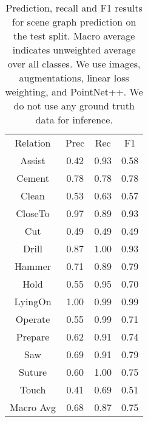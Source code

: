 \begin{table}
	\centering
    \begin{tabular}{|c|c|c|c|}
	    \cline{1-4}
		Relation & Prec & Rec & F1 \\\cline{1-4}
		Assist & 0.42 & 0.93 & 0.58 \\\cline{1-4}
		Cement & 0.78 & 0.78 & 0.78 \\\cline{1-4}
		Clean & 0.53 & 0.63 & 0.57 \\\cline{1-4}
		CloseTo & 0.97 & 0.89 & 0.93 \\\cline{1-4}
		Cut & 0.49 & 0.49 & 0.49 \\\cline{1-4}
		Drill & 0.87 & 1.00 & 0.93 \\\cline{1-4}
		Hammer & 0.71 & 0.89 & 0.79 \\\cline{1-4}
		Hold & 0.55 & 0.95 & 0.70\\\cline{1-4}
		LyingOn &  1.00 & 0.99 & 0.99 \\\cline{1-4}
		Operate & 0.55 & 0.99 & 0.71 \\\cline{1-4}
		Prepare & 0.62 & 0.91 & 0.74 \\\cline{1-4}
		Saw &  0.69 & 0.91 & 0.79 \\\cline{1-4}
		Suture & 0.60 & 1.00 & 0.75 \\\cline{1-4}
		Touch & 0.41 & 0.69 & 0.51 \\\cline{1-4}
		Macro Avg & 0.68 & 0.87 & 0.75 \\\cline{1-4}
	\end{tabular}
    \caption{Prediction, recall and F1 results for scene graph prediction on the test split. Macro average indicates unweighted average over all classes. We use images, augmentations, linear loss weighting, and PointNet++. We do not use any ground truth data for inference.}
	\label{tab:scene_graph_prediction_results}
\end{table}

